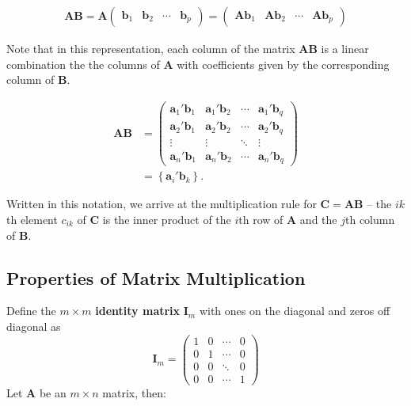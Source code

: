 \documentclass[
]{book}
\theoremstyle{definition}
\theoremstyle{definition}
\theoremstyle{definition}
\theoremstyle{remark}
\begin{document}
\[
\begin{aligned}
\mathbf{A} \mathbf{B}  = \mathbf{A} \begin{pmatrix} \mathbf{b}_1 & \mathbf{b}_2 & \cdots & \mathbf{b}_p
\end{pmatrix}  = \begin{pmatrix} \mathbf{A} \mathbf{b}_1 & \mathbf{A} \mathbf{b}_2 & \cdots & \mathbf{A} \mathbf{b}_p
\end{pmatrix} 
\end{aligned}
\]

Note that in this representation, each column of the matrix \(\mathbf{A}\mathbf{B}\) is a linear combination the the columns of \(\mathbf{A}\) with coefficients given by the corresponding column of \(\mathbf{B}\).

\[
\begin{aligned}
\mathbf{A} \mathbf{B} & = \begin{pmatrix} \mathbf{a}_1' \mathbf{b}_1 & \mathbf{a}_1' \mathbf{b}_2 & \cdots & \mathbf{a}_1' \mathbf{b}_q \\
\mathbf{a}_2' \mathbf{b}_1 & \mathbf{a}_2' \mathbf{b}_2 & \cdots & \mathbf{a}_2' \mathbf{b}_q \\
\vdots & \vdots & \ddots & \vdots \\
\mathbf{a}_n' \mathbf{b}_1 & \mathbf{a}_n' \mathbf{b}_2  & \cdots & \mathbf{a}_n' \mathbf{b}_q
\end{pmatrix} \\
& = \left\{ \mathbf{a}_i' \mathbf{b}_k  \right\}.
\end{aligned}
\]

Written in this notation, we arrive at the multiplication rule for \(\mathbf{C} = \mathbf{A} \mathbf{B}\) -- the \(ik\)th element \(c_{ik}\) of \(\mathbf{C}\) is the inner product of the \(i\)th row of \(\mathbf{A}\) and the \(j\)th column of \(\mathbf{B}\).

\hypertarget{properties-of-matrix-multiplication}{%
\subsection{Properties of Matrix Multiplication}\label{properties-of-matrix-multiplication}}

Define the \(m \times m\) \textbf{identity matrix} \(\mathbf{I}_m\) with ones on the diagonal and zeros off diagonal as
\[
\mathbf{I}_m = \begin{pmatrix} 1 & 0 & \cdots & 0 \\ 0 & 1 & \cdots & 0 \\ 0 & 0 & \ddots & 0 \\ 0 & 0 & \cdots & 1\end{pmatrix}
\]
Let \(\mathbf{A}\) be an \(m \times n\) matrix, then:
\end{document}
